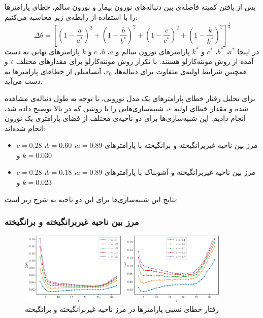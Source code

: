 پس از یافتن کمینه فاصله‌ی بین دنباله‌های نورون بیمار و نورون سالم، خطای پارامترها را با استفاده از رابطه‌ی زیر محاسبه می‌کنیم:
\begin{equation}
    \Delta \theta = \left[ \left( 1 - \frac{a}{a^{*}} \right)^2 + \left( 1 - \frac{b}{b^{*}} \right)^2 + \left( 1 - \frac{c}{c^{*}} \right)^2 + \left( 1- \frac{k }{k^{*}} \right)^2 \right]^{\frac{1}{2}}
\end{equation}
در اینجا
\( a^{*} \)، \( b^{*} \)، \( c^{*} \) و \( k^{*} \)
پارامترهای نورون سالم و
\( a \)، \( b \)، \( c \) و \( k \)
پارامترهای نهایی به دست آمده از روش مونته‌کارلو هستند.
با تکرار روش مونته‌کارلو برای مقدارهای مختلف
\( \varepsilon \)
و همچنین شرایط اولیه‌ی متفاوت برای دنباله‌ها،
\( r_{0} \)،
آنسامبلی از خطاهای پارامترها به دست می‌آید.

برای تحلیل رفتار خطای پارامتر‌های یک مدل نورونی، با توجه به طول دنباله‌ی مشاهده شده و مقدار خطای اولیه
\( \varepsilon \)،
شبیه‌سازی‌هایی را با روشی که در بالا توضیح داده شد، انجام دادیم.
این شبیه‌سازی‌ها برای دو ناحیه‌ی مختلف از فضای پارامتری یک نورون انجام شده‌اند:
\begin{itemize}[label=-]
    \item مرز بین ناحیه غیربرانگیخته و برانگیخته با پارامتر‌های
          \( a = 0.89 \)، \( b = 0.60 \)، \( c = 0.28 \) و \( k = 0.030 \)
    \item مرز بین ناحیه غیربرانگیخته و آشوبناک با پارامترهای
          \( a = 0.89 \)، \( b = 0.18 \)، \( c = 0.28 \) و \( k = 0.023 \)
\end{itemize}
نتایج این شبیه‌سازی‌ها برای این دو ناحیه به شرح زیر است:

\subsubsection{مرز بین ناحیه غیربرانگیخته و برانگیخته}

\begin{figure}[!ht]
    \centering
    \includegraphics[width=0.9\textwidth]{figures/error_excitable}
    \caption{رفتار خطای نسبی پارامترها در مرز ناحیه غیربرانگیخته و برانگیخته}
    \label{fig:error_excitable}
\end{figure}

